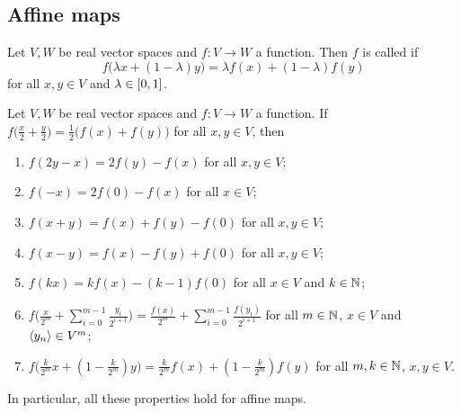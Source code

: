 \subsection{Affine maps}
\begin{definition}
Let $V,W$ be real vector spaces and $f: V\to W$ a function. Then $f$ is called  if
\[ f\big(\lambda x + (1-\lambda)y\big) = \lambda f(x) + (1-\lambda)f(y) \]
for all $x,y\in V$ and $\lambda\in \interval{0,1}$.
\end{definition}

\begin{lemma} \label{midpointPreservingMapLemma}
Let $V,W$ be real vector spaces and $f: V\to W$ a function. If $f\Big(\frac{x}{2} + \frac{y}{2}\Big) = \frac{1}{2}\big(f(x)+f(y)\big)$ for all $x,y\in V$, then
\begin{enumerate}
\item $f(2y-x) = 2f(y)-f(x)$ for all $x,y\in V$;
\item $f(-x) = 2f(0)-f(x)$ for all $x\in V$;
\item $f(x+y) = f(x)+f(y)-f(0)$ for all $x,y\in V$;
\item $f(x-y) = f(x)-f(y)+f(0)$ for all $x,y\in V$;
\item $f(kx) = kf(x) - (k-1)f(0)$ for all $x\in V$ and $k\in \mathbb{N}$;
\item $f\Big(\frac{x}{2^m} + \sum_{i=0}^{m-1} \frac{y_i}{2^{i+1}}\Big) = \frac{f(x)}{2^m} + \sum_{i=0}^{m-1} \frac{f(y_i)}{2^{i+1}}$ for all $m\in \mathbb{N}$, $x\in V$ and $\left\langle y_n \right\rangle\in V^m$;
\item $f\Big(\frac{k}{2^m}x + (1- \frac{k}{2^m})y\Big) = \frac{k}{2^m}f(x) + (1- \frac{k}{2^m})f(y)$ for all $m,k\in\mathbb{N}$, $x,y\in V$.
\end{enumerate}
\end{lemma}
In particular, all these properties hold for affine maps.
